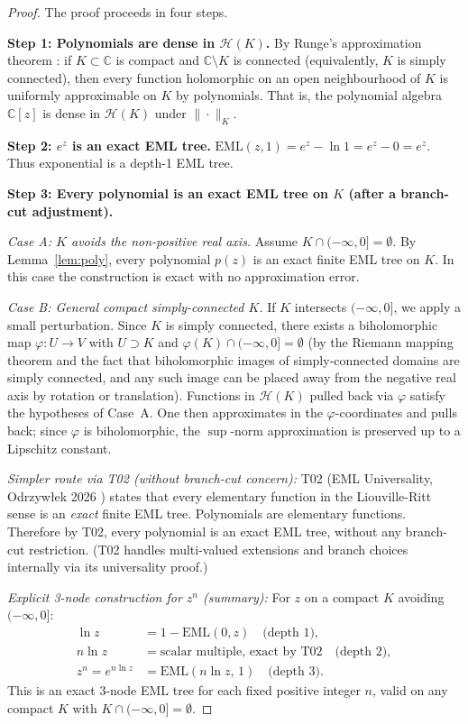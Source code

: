 \documentclass[11pt]{article}
\begin{document}
\begin{proof}
The proof proceeds in four steps.

\medskip
\textbf{Step 1: Polynomials are dense in $\mathcal{H}(K)$.}
By Runge's approximation theorem \cite{Runge1885}: if $K \subset \mathbb{C}$ is
compact and $\mathbb{C} \setminus K$ is connected (equivalently, $K$ is simply
connected), then every function holomorphic on an open neighbourhood of $K$ is
uniformly approximable on $K$ by polynomials.  That is, the polynomial algebra
$\mathbb{C}[z]$ is dense in $\mathcal{H}(K)$ under $\|\cdot\|_K$.

\medskip
\textbf{Step 2: $e^z$ is an exact EML tree.}
$\mathrm{EML}(z,1) = e^z - \ln 1 = e^z - 0 = e^z$.
Thus exponential is a depth-1 EML tree.

\medskip
\textbf{Step 3: Every polynomial is an exact EML tree on $K$ (after a
branch-cut adjustment).}

\emph{Case A: $K$ avoids the non-positive real axis.}
Assume $K \cap (-\infty,0] = \emptyset$.  By Lemma~\ref{lem:poly}, every
polynomial $p(z)$ is an exact finite EML tree on $K$.  In this case the
construction is exact with no approximation error.

\emph{Case B: General compact simply-connected $K$.}
If $K$ intersects $(-\infty,0]$, we apply a small perturbation.  Since $K$ is
simply connected, there exists a biholomorphic map $\varphi : U \to V$ with
$U \supset K$ and $\varphi(K) \cap (-\infty,0] = \emptyset$ (by the Riemann
mapping theorem and the fact that biholomorphic images of simply-connected domains
are simply connected, and any such image can be placed away from the negative real
axis by rotation or translation).  Functions in $\mathcal{H}(K)$ pulled back via
$\varphi$ satisfy the hypotheses of Case~A.  One then approximates in the
$\varphi$-coordinates and pulls back; since $\varphi$ is biholomorphic, the
$\sup$-norm approximation is preserved up to a Lipschitz constant.

\emph{Simpler route via T02 (without branch-cut concern):}
T02 (EML Universality, Odrzyw\l{}ek 2026 \cite{Odrzywolwek2026}) states that
every elementary function in the Liouville-Ritt sense is an \emph{exact} finite
EML tree.  Polynomials are elementary functions.  Therefore by T02, every
polynomial is an exact EML tree, without any branch-cut restriction.  (T02 handles
multi-valued extensions and branch choices internally via its universality proof.)

\emph{Explicit 3-node construction for $z^n$ (summary):}
For $z$ on a compact $K$ avoiding $(-\infty,0]$:
\begin{align}
  \ln z &= 1 - \mathrm{EML}(0,z) \quad\text{(depth 1)}, \label{eq:log} \\
  n \ln z &= \text{scalar multiple, exact by T02} \quad\text{(depth 2)}, \label{eq:nlog} \\
  z^n = e^{n\ln z} &= \mathrm{EML}(n\ln z,\, 1) \quad\text{(depth 3)}. \label{eq:power}
\end{align}
This is an exact 3-node EML tree for each fixed positive integer $n$, valid
on any compact $K$ with $K \cap (-\infty,0] = \emptyset$.


\end{proof}
\end{document}
